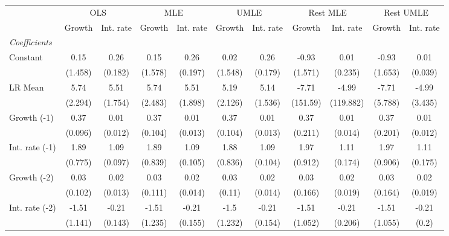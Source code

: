 \begin{table}[htbp] 
	\centering
	\begin{tabular}{@{\extracolsep{4pt}}lcccccccccc@{}}		\hline\hline
		 		 & \multicolumn{2}{c}{OLS} &\multicolumn{2}{c}{MLE} &\multicolumn{2}{c}{UMLE} &\multicolumn{2}{c}{Rest MLE} &\multicolumn{2}{c}{Rest UMLE} \\ 
 		 & Growth 	 & Int. rate 	 & Growth 	 & Int. rate 	 & Growth 	 & Int. rate 	 & Growth 	 & Int. rate 	 & Growth 	 & Int. rate\\\cline{2-3}\cline{4-5}\cline{6-7}\cline{8-9}\cline{10-11}
\rule{0pt}{4ex} 
 \emph{Coefficients} 	  		 & 		 & 		 & 		 & 		 & 		 & 		 & 		 & 		 & 		 &\\ 
\quad Constant 	 & 0.15 	 & 0.26 	 & 0.15 	 & 0.26 	 & 0.02 	 & 0.26 	 & -0.93 	 & 0.01 	 & -0.93 	 & 0.01	 \\ 
 		 & (1.458) 	 & (0.182) 	 & (1.578) 	 & (0.197) 	 & (1.548) 	 & (0.179) 	 & (1.571) 	 & (0.235) 	 & (1.653) 	 & (0.039) 	 \\ 
\quad LR Mean 	 & 5.74 	 & 5.51 	 & 5.74 	 & 5.51 	 & 5.19 	 & 5.14 	 & -7.71 	 & -4.99 	 & -7.71 	 & -4.99	 \\ 
 		 & (2.294) 	 & (1.754) 	 & (2.483) 	 & (1.898) 	 & (2.126) 	 & (1.536) 	 & (151.59) 	 & (119.882) 	 & (5.788) 	 & (3.435) 	 \\ 
\quad Growth (-1) 	 &0.37 	 & 0.01 	 & 0.37 	 & 0.01 	 & 0.37 	 & 0.01 	 & 0.37 	 & 0.01 	 & 0.37 	 & 0.01	 \\ 
 		 & (0.096) 	 & (0.012) 	 & (0.104) 	 & (0.013) 	 & (0.104) 	 & (0.013) 	 & (0.211) 	 & (0.014) 	 & (0.201) 	 & (0.012) 	 \\ 
\quad Int. rate (-1) 	 &1.89 	 & 1.09 	 & 1.89 	 & 1.09 	 & 1.88 	 & 1.09 	 & 1.97 	 & 1.11 	 & 1.97 	 & 1.11	 \\ 
 		 & (0.775) 	 & (0.097) 	 & (0.839) 	 & (0.105) 	 & (0.836) 	 & (0.104) 	 & (0.912) 	 & (0.174) 	 & (0.906) 	 & (0.175) 	 \\ 
\quad Growth (-2) 	 &0.03 	 & 0.02 	 & 0.03 	 & 0.02 	 & 0.03 	 & 0.02 	 & 0.03 	 & 0.02 	 & 0.03 	 & 0.02	 \\ 
 		 & (0.102) 	 & (0.013) 	 & (0.111) 	 & (0.014) 	 & (0.11) 	 & (0.014) 	 & (0.166) 	 & (0.019) 	 & (0.164) 	 & (0.019) 	 \\ 
\quad Int. rate (-2) 	 &-1.51 	 & -0.21 	 & -1.51 	 & -0.21 	 & -1.5 	 & -0.21 	 & -1.51 	 & -0.21 	 & -1.51 	 & -0.21	 \\ 
 		 & (1.141) 	 & (0.143) 	 & (1.235) 	 & (0.155) 	 & (1.232) 	 & (0.154) 	 & (1.052) 	 & (0.206) 	 & (1.055) 	 & (0.2) 	 \\ 

\end{tabular}
\end{table}
